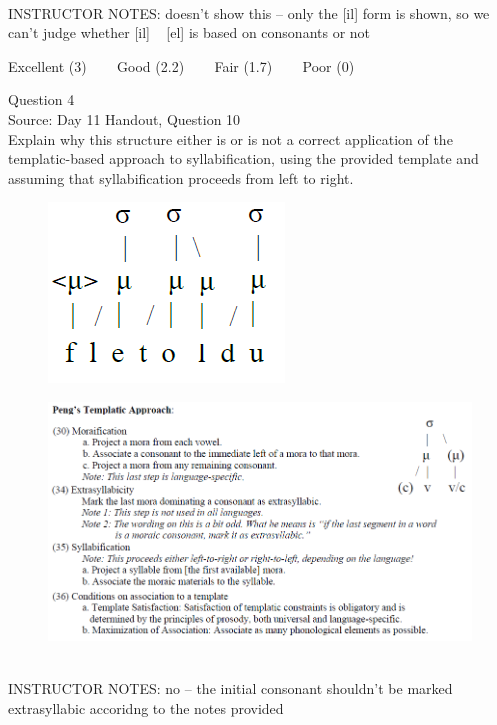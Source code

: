 \documentclass[12pt]{article}
\begin{document}
~\\
INSTRUCTOR NOTES: doesn't show this -- only the [il] form is shown, so we can't judge whether [il] ~ [el] is based on consonants or not


\vfill
Excellent (3) ~~~ Good (2.2) ~~~ Fair (1.7) ~~~ Poor (0)
\newpage

{\large Question 4}\\

Source: Day 11 Handout, Question 10\\

Explain why this structure either is or is not a correct application of the templatic-based approach to syllabification, using the provided template and assuming that syllabification proceeds from left to right.\\

\begin{figure}[H]
\includegraphics{../images/pengtemplate_fletoldu_no.png}
\end{figure}
\begin{figure}[H]
\includegraphics{../images/peng_template_withdiagram.png}
\end{figure}

~\\
INSTRUCTOR NOTES: no -- the initial consonant shouldn't be marked extrasyllabic accoridng to the notes provided
\end{document}
